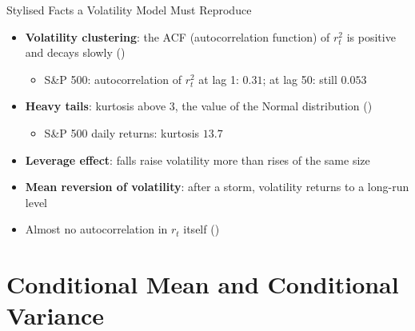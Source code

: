 \begin{frame}{Stylised Facts a Volatility Model Must Reproduce}
\itemsize{\small}
\begin{itemize}
    \item \textbf{Volatility clustering}: the ACF (autocorrelation function) of $r_t^2$ is positive and decays slowly ()
    \begin{itemize}
        \item S\&P 500: autocorrelation of $r_t^2$ at lag 1: $0.31$; at lag 50: still $0.053$
    \end{itemize}
    \item \textbf{Heavy tails}: kurtosis above 3, the value of the Normal distribution ()
    \begin{itemize}
        \item S\&P 500 daily returns: kurtosis $13.7$
    \end{itemize}
    \item \textbf{Leverage effect}: falls raise volatility more than rises of the same size 
    \item \textbf{Mean reversion of volatility}: after a storm, volatility returns to a long-run level
    \item Almost no autocorrelation in $r_t$ itself ()
\end{itemize}
\end{frame}


\section{Conditional Mean and Conditional Variance}

